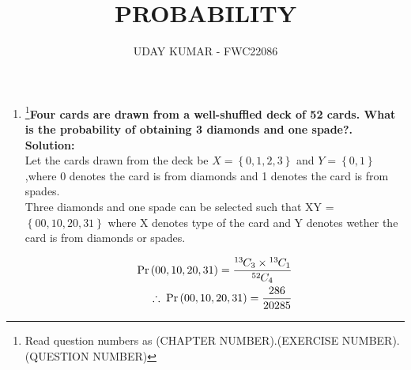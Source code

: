 \documentclass{article}
\providecommand{\cbrak}[1]{\ensuremath{\left\{#1\right\}}}
\newcommand{\solution}{\noindent \textbf{Solution: }}
\newcommand*{\permcomb}[4][0mu]{{{}^{#3}\mkern#1#2_{#4}}}
\newcommand*{\comb}[1][-1mu]{\permcomb[#1]{C}}
\begin{document}
\title{PROBABILITY}
\author{\Large UDAY KUMAR - FWC22086}
\date{}

\maketitle

\begin{enumerate}[label=16.\arabic{enumi}.\arabic{enumii}]%
\setcounter{enumi}{3}
\setcounter{enumii}{2}

\item \footnote{Read question numbers as (CHAPTER NUMBER).(EXERCISE NUMBER).(QUESTION NUMBER)}\textbf {Four cards are drawn from a well-shuffled deck of 52 cards. What is the probability of obtaining 3 diamonds and one spade?.}\\[1ex]
	\solution\\
		Let the cards drawn from the deck be $X = \cbrak{0,1,2,3}$ and $Y = \cbrak{0,1}$,where  0 denotes the card is from diamonds and  1 denotes the card is from spades.\\
		 Three diamonds and one spade can be selected such that  XY = $\cbrak{00,10,20,31}$ where X denotes type of the card   and Y denotes wether the card is from diamonds or spades.
  

 
	\begin{align}
	   \Pr{(00,10,20,31)} =\dfrac{\comb{13}{3} \times \comb{13}{1}}{\comb{52}{4}}\\ 
\therefore \;\Pr{(00,10,20,31)} = \frac{286}{20285}
\end{align}
\end{enumerate}
\end{document}
